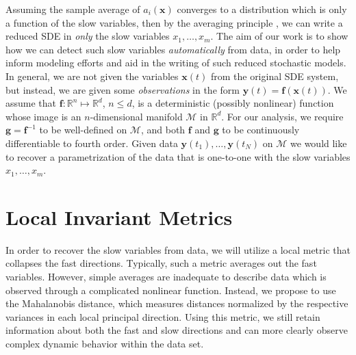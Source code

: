 Assuming the sample average of $a_i(\mathbf{x})$ converges to a distribution which is only a function of the slow variables, then by the averaging principle \cite{freidlin2012random}, we can write a reduced SDE in {\em only} the slow variables $x_1, \dots, x_m$.
%
The aim of our work is to show how we can detect such slow variables {\em automatically} from data, in order to help inform modeling efforts and aid in the writing of such reduced stochastic models.
%
In general, we are not given the variables $\mathbf{x}(t)$ from the original SDE system, but instead, we are given some {\em observations}
 in the form $\mathbf{y}(t) = \mathbf{f} (\mathbf{x}(t))$.
%
We assume that $\mathbf{f}: \mathbb{R}^n \mapsto \mathbb{R}^d$, $n \le d$, is a deterministic (possibly nonlinear) function whose image is an $n$-dimensional manifold $\mathcal{M}$ in $\mathbb{R}^d$.
%
%
For our analysis, we require $\mathbf{g} = \mathbf{f} ^{-1}$ to be well-defined on $\mathcal{M}$, and both $\mathbf{f}$ and $\mathbf{g}$ to be continuously differentiable to fourth order.
%
Given data $\mathbf{y}(t_1),\ldots,\mathbf{y}(t_N)$ on $\mathcal{M}$ we would like to recover a parametrization of the data that is one-to-one with the
slow variables $x_1, \dots, x_m$.

\section{Local Invariant Metrics}

In order to recover the slow variables from data, we will utilize a local metric that collapses the fast directions.
%
Typically, such a metric averages out the fast variables.
%
However, simple averages are inadequate to describe data which is observed through a complicated nonlinear function.
%
Instead, we propose to use the Mahalanobis distance, which measures distances normalized by the respective variances in each local principal direction.
%
Using this metric, we still retain information about both the fast and slow directions and can
more clearly observe complex dynamic behavior within the data set.

